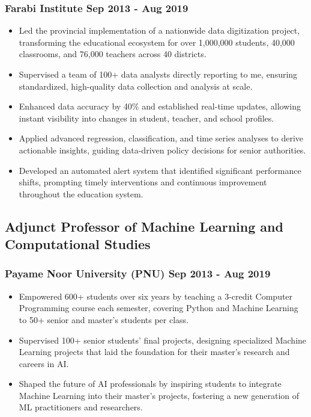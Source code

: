 \documentclass[11pt]{article} %
\begin{document}
\subsubsection{Farabi Institute \hfill Sep 2013 - Aug 2019}
\begin{itemize}
	\item Led the provincial implementation of a nationwide data digitization project, transforming the educational ecosystem for over 1,000,000 students, 40,000 classrooms, and 76,000 teachers across 40 districts.
	\item Supervised a team of 100+ data analysts directly reporting to me, ensuring standardized, high-quality data collection and analysis at scale. 
	\item Enhanced data accuracy by 40\% and established real-time updates, allowing instant visibility into changes in student, teacher, and school profiles.
	\item Applied advanced regression, classification, and time series analyses to derive actionable insights, guiding data-driven policy decisions for senior authorities.
	\item Developed an automated alert system that identified significant performance shifts, prompting timely interventions and continuous improvement throughout the education system.
\end{itemize}

\subsection{Adjunct Professor of Machine Learning and Computational Studies}
\subsubsection{Payame Noor University (PNU) \hfill Sep 2013 - Aug 2019}
\begin{itemize}
	\item Empowered 600+ students over six years by teaching a 3-credit Computer Programming course each semester, covering Python and Machine Learning to 50+ senior and master's students per class.
	\item Supervised 100+ senior students' final projects, designing specialized Machine Learning projects that laid the foundation for their master's research and careers in AI.
	\item Shaped the future of AI professionals by inspiring students to integrate Machine Learning into their master's projects, fostering a new generation of ML practitioners and researchers.
\end{itemize}
\end{document}

